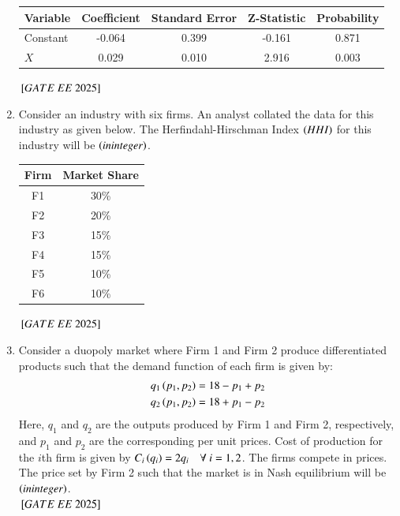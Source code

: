 \documentclass[journal,12pt,onecolumn]{IEEEtran}
\theoremstyle{remark}
\begin{document}
\begin{enumerate}
\begin{center}
\begin{tabular}{|l|c|c|c|c|}
\hline
Variable & Coefficient & Standard Error & Z-Statistic & Probability \\
\hline
Constant & -0.064 & 0.399 & -0.161 & 0.871 \\
$X$ & 0.029 & 0.010 & 2.916 & 0.003 \\
\hline
\end{tabular}
\end{center}
 ${}\left[GATE\ EE\ 2025\right]$\\
\item Consider an industry with six firms. An analyst collated the data for this industry as given below. The Herfindahl-Hirschman Index $\left(HHI\right)$ for this industry will be \underline{\hspace{2cm}} $\left(in integer\right)$.
\begin{center}
\begin{tabular}{|c|c|}
\hline
Firm & Market Share \\
\hline
F1 & 30\% \\
F2 & 20\% \\
F3 & 15\% \\
F4 & 15\% \\
F5 & 10\% \\
F6 & 10\% \\
\hline
\end{tabular}
\end{center} 
 ${}\left[GATE\ EE\ 2025\right]$\\
\item Consider a duopoly market where Firm 1 and Firm 2 produce differentiated products such that the demand function of each firm is given by:
\begin{align*}
q_1\left(p_1, p_2\right) &= 18 - p_1 + p_2 \\
q_2\left(p_1, p_2\right) &= 18 + p_1 - p_2
\end{align*}
Here, $q_1$ and $q_2$ are the outputs produced by Firm 1 and Firm 2, respectively, and $p_1$ and $p_2$ are the corresponding per unit prices. Cost of production for the $i$th firm is given by $C_i\left(q_i\right) = 2q_i \quad \forall~i=1,2$. The firms compete in prices. The price set by Firm 2 such that the market is in Nash equilibrium will be \underline{\hspace{2cm}} $\left(in integer\right)$.\\

 ${}\left[GATE\ EE\ 2025\right]$\\
\end{enumerate}
\renewcommand{\thefigure}{\theenumi}
\renewcommand{\thetable}{\theenumi}
\end{document}
